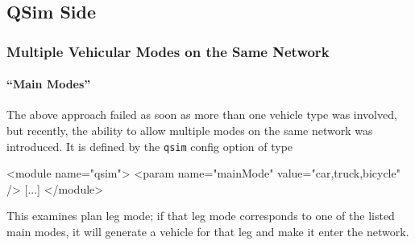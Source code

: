 \subsection{QSim Side}
\label{sec:using-qsim-multimodal}
\subsubsection{Multiple Vehicular Modes on the Same Network}


\paragraph{\enquote{Main Modes}}
The above approach failed as soon as more than one vehicle type was involved, but recently, the ability to allow multiple modes on the same network was introduced.  
It is defined by the \lstinline{qsim} config option of type
\begin{xml}
<module name="qsim">
   <param name="mainMode" value="car,truck,bicycle" />
   [...]
</module>
\end{xml}
This examines plan leg mode; if that leg mode corresponds to one of the listed main modes, it will generate a vehicle for that leg and make it enter the network.

